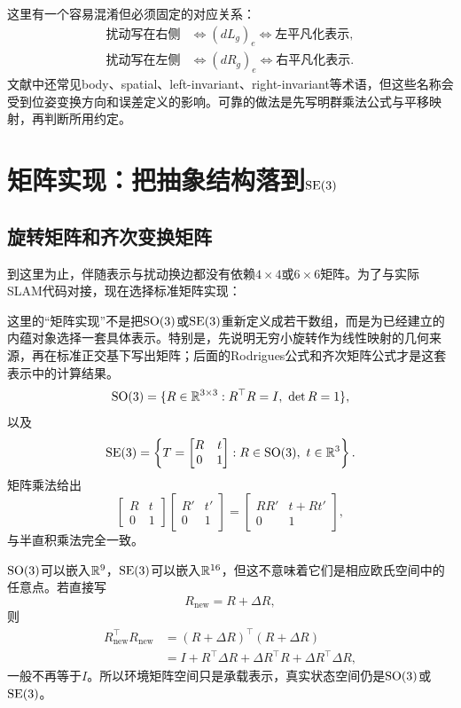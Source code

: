 这里有一个容易混淆但必须固定的对应关系：
\[
\begin{aligned}
    \text{扰动写在右侧}
    &\Longleftrightarrow (dL_g)_e
    \Longleftrightarrow \text{左平凡化表示},\\
    \text{扰动写在左侧}
    &\Longleftrightarrow (dR_g)_e
    \Longleftrightarrow \text{右平凡化表示}.
\end{aligned}
\]
文献中还常见body、spatial、left-invariant、right-invariant等术语，但这些名称会受到位姿变换方向和误差定义的影响。可靠的做法是先写明群乘法公式与平移映射，再判断所用约定。


\section{矩阵实现：把抽象结构落到$\operatorname{SE}(3)$}

\subsection{旋转矩阵和齐次变换矩阵}

到这里为止，伴随表示与扰动换边都没有依赖$4\times4$或$6\times6$矩阵。为了与实际SLAM代码对接，现在选择标准矩阵实现：

这里的“矩阵实现”不是把$\operatorname{SO}(3)$或$\operatorname{SE}(3)$重新定义成若干数组，而是为已经建立的内蕴对象选择一套具体表示。特别是，先说明无穷小旋转作为线性映射的几何来源，再在标准正交基下写出矩阵；后面的Rodrigues公式和齐次矩阵公式才是这套表示中的计算结果。
\[
    \SO(3)=\{R\in\R^{3\times3}:R^\top R=I,\ \det R=1\},
\]
以及
\[
    \operatorname{SE}(3)=
    \left\{
    T=\begin{bmatrix}R&t\\0&1\end{bmatrix}:R\in\operatorname{SO}(3),\ t\in\mathbb{R}^3
    \right\}.
\]
矩阵乘法给出
\[
    \begin{bmatrix}R&t\\0&1\end{bmatrix}
    \begin{bmatrix}R'&t'\\0&1\end{bmatrix}
    =
    \begin{bmatrix}RR'&t+Rt'\\0&1\end{bmatrix},
\]
与半直积乘法完全一致。

\begin{proposition}[矩阵状态空间不是环境欧氏空间]
$\operatorname{SO}(3)$可以嵌入$\mathbb{R}^9$，$\operatorname{SE}(3)$可以嵌入$\mathbb{R}^{16}$，但这不意味着它们是相应欧氏空间中的任意点。若直接写
\[
    R_{\mathrm{new}}=R+\Delta R,
\]
则
\[
\begin{aligned}
    R_{\mathrm{new}}^\top R_{\mathrm{new}}
    &=(R+\Delta R)^\top(R+\Delta R)\\
    &=I+R^\top\Delta R+\Delta R^\top R+\Delta R^\top\Delta R,
\end{aligned}
\]
一般不再等于$I$。所以环境矩阵空间只是承载表示，真实状态空间仍是$\operatorname{SO}(3)$或$\operatorname{SE}(3)$。
\end{proposition}

